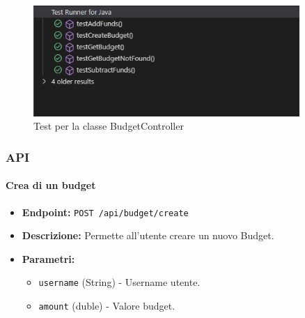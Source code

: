 \begin{figure}[H]
    \centering
    \includegraphics[width=0.9\textwidth]{images/BudgetControllerTest.png}
    \caption{Test per la classe BudgetController}
    \label{fig:BudgetControllerTest}
\end{figure}

\subsubsection{API}

\paragraph{Crea di un budget} 

\begin{itemize}
    \item \textbf{Endpoint:} \texttt{POST /api/budget/create}
    \item \textbf{Descrizione:} Permette all'utente creare un nuovo Budget.
    \item \textbf{Parametri:}
    \begin{itemize}
        \item \texttt{username} (String) - Username utente.
        \item \texttt{amount} (duble) - Valore budget.
    \end{itemize}
\end{itemize}

